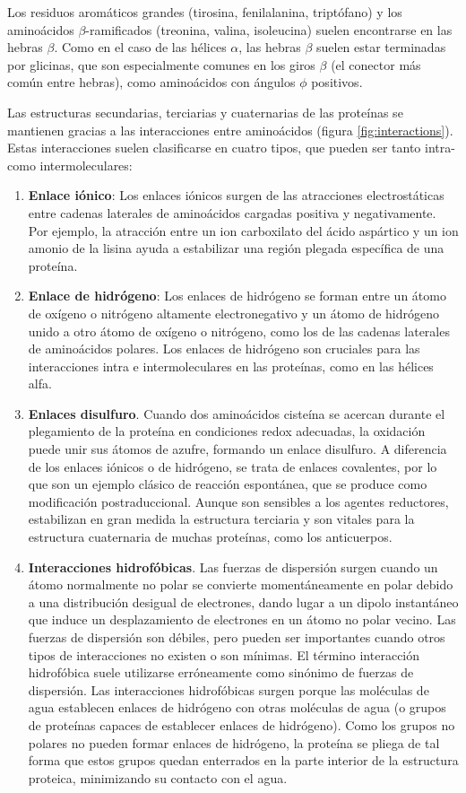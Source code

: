 Los residuos aromáticos grandes (tirosina, fenilalanina, triptófano) y los aminoácidos $\beta$-ramificados (treonina, valina, isoleucina) suelen encontrarse en las hebras $\beta$. Como en el caso de las hélices $\alpha$, las hebras $\beta$ suelen estar terminadas por glicinas, que son especialmente comunes en los giros $\beta$ (el conector más común entre hebras), como aminoácidos con ángulos $\phi$ positivos.

Las estructuras secundarias, terciarias y cuaternarias de las proteínas se mantienen gracias a las interacciones entre aminoácidos (figura \ref{fig:interactions}). Estas interacciones suelen clasificarse en cuatro tipos, que pueden ser tanto intra- como intermoleculares:
\begin{enumerate}
\item \textbf{Enlace iónico}: Los enlaces iónicos surgen de las atracciones electrostáticas entre cadenas laterales de aminoácidos cargadas positiva y negativamente. Por ejemplo, la atracción entre un ion carboxilato del ácido aspártico y un ion amonio de la lisina ayuda a estabilizar una región plegada específica de una proteína.
\item \textbf{Enlace de hidrógeno}: Los enlaces de hidrógeno se forman entre un átomo de oxígeno o nitrógeno altamente electronegativo y un átomo de hidrógeno unido a otro átomo de oxígeno o nitrógeno, como los de las cadenas laterales de aminoácidos polares. Los enlaces de hidrógeno son cruciales para las interacciones intra e intermoleculares en las proteínas, como en las hélices alfa.
\item \textbf{Enlaces disulfuro}. Cuando dos aminoácidos cisteína se acercan durante el plegamiento de la proteína en condiciones redox adecuadas, la oxidación puede unir sus átomos de azufre, formando un enlace disulfuro. A diferencia de los enlaces iónicos o de hidrógeno, se trata de enlaces covalentes, por lo que son un ejemplo clásico de reacción espontánea, que se produce como modificación postraduccional. Aunque son sensibles a los agentes reductores, estabilizan en gran medida la estructura terciaria y son vitales para la estructura cuaternaria de muchas proteínas, como los anticuerpos.
\item \textbf{Interacciones hidrofóbicas}. Las fuerzas de dispersión surgen cuando un átomo normalmente no polar se convierte momentáneamente en polar debido a una distribución desigual de electrones, dando lugar a un dipolo instantáneo que induce un desplazamiento de electrones en un átomo no polar vecino. Las fuerzas de dispersión son débiles, pero pueden ser importantes cuando otros tipos de interacciones no existen o son mínimas. El término interacción hidrofóbica suele utilizarse erróneamente como sinónimo de fuerzas de dispersión. Las interacciones hidrofóbicas surgen porque las moléculas de agua establecen enlaces de hidrógeno con otras moléculas de agua (o grupos de proteínas capaces de establecer enlaces de hidrógeno). Como los grupos no polares no pueden formar enlaces de hidrógeno, la proteína se pliega de tal forma que estos grupos quedan enterrados en la parte interior de la estructura proteica, minimizando su contacto con el agua.
\end{enumerate}

